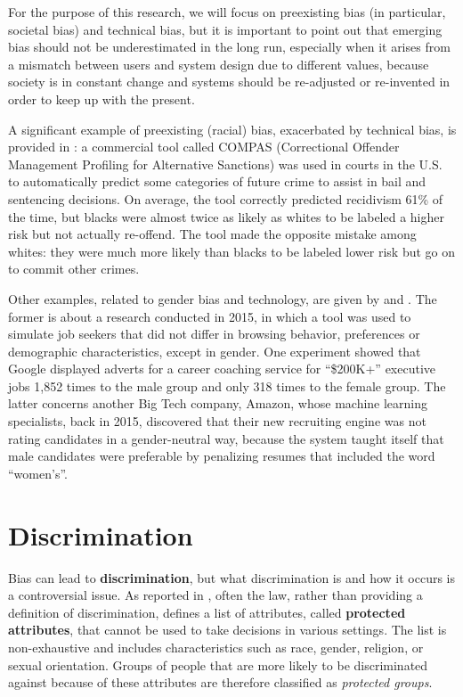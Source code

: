 For the purpose of this research, we will focus on preexisting bias (in particular, societal bias) and technical bias, but it is important to point out that emerging bias should not be underestimated in the long run, especially when it arises from a mismatch between users and system design due to different values, because society is in constant change and systems should be re-adjusted or re-invented in order to keep up with the present.

A significant example of preexisting (racial) bias, exacerbated by technical bias, is provided in \cite{angwin2016machine}: a commercial tool called COMPAS (Correctional Offender Management Profiling for Alternative Sanctions) was used in courts in the U.S. to automatically predict some categories of future crime to assist in bail and sentencing decisions. On average, the tool correctly predicted recidivism 61\% of the time, but blacks were almost twice as likely as whites to be labeled a higher risk but not actually re-offend. The tool made the opposite mistake among whites: they were much more likely than blacks to be labeled lower risk but go on to commit other crimes.

Other examples, related to gender bias and technology, are given by \cite{gibbs2015women} and \cite{dastin2018amazon}. The former is about a research conducted in 2015, in which a tool was used to simulate job seekers that did not differ in browsing behavior, preferences or demographic characteristics, except in gender. One experiment showed that Google displayed adverts for a career coaching service for ``\$200K+'' executive jobs 1,852 times to the male group and only 318 times to the female group. The latter concerns another Big Tech company, Amazon, whose machine learning specialists, back in 2015, discovered that their new recruiting engine was not rating candidates in a gender-neutral way, because the system taught itself that male candidates were preferable by penalizing resumes that included the word ``women's''.


\section{Discrimination}
Bias can lead to \textbf{discrimination}, but what discrimination is and how it occurs is a controversial issue. As reported in \cite{scantamburlo2019machine}, often the law, rather than providing a definition of discrimination, defines a list of attributes, called \textbf{protected attributes}, that cannot be used to take decisions in various settings. The list is non-exhaustive and includes characteristics such as race, gender, religion, or sexual orientation. Groups of people that are more likely to be discriminated against because of these attributes are therefore classified as \textit{protected groups}.

